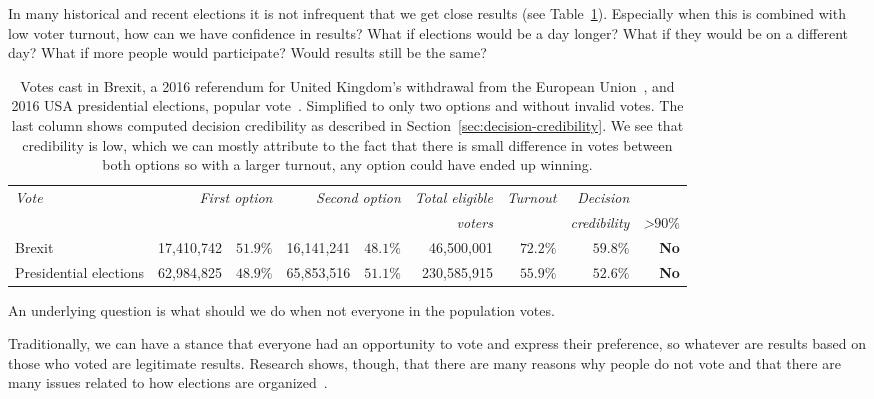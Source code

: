 \documentclass[format=acmsmall, review=true, screen=true, anonymous=true]{acmart}
\begin{document}
In many historical and recent elections it is not infrequent that we get close results (see Table~\ref{tab:example}).
Especially when this is combined with low voter turnout, how can we have confidence in results?
What if elections would be a day longer? What if they would be on a different day? What if
more people would participate? Would results still be the same?

\begin{table}
  \centering
  \begin{small}
  \begin{tabular}{l r r r r r r r r}
    {\small\textit{Vote}} & \multicolumn{2}{r}{\small \textit{First option}} & \multicolumn{2}{r}{\small \textit{Second option}} & {\small \textit{Total eligible}} & {\small \textit{Turnout}} & {\small \textit{Decision}} \\
    & & & & & {\small \textit{voters}} & & {\small \textit{credibility}} & {\small \textit{>$90\%$}}\\
    \midrule
    Brexit & 17,410,742 & $51.9\%$ & 16,141,241 & $48.1\%$ & 46,500,001 & $72.2\%$ & $59.8\%$ & \textbf{No}\\
    Presidential elections & 62,984,825 & $48.9\%$ & 65,853,516 & $51.1\%$ & 230,585,915 & $55.9\%$ & $52.6\%$ & \textbf{No}\\
  \end{tabular}
  \end{small}
  \bigskip\caption{Votes cast in Brexit, a 2016 referendum for United Kingdom's withdrawal from the European Union~\protect\cite{brexitresults},
  and 2016 USA presidential elections, popular vote~\protect\cite{usaresults1,usaresults2}. Simplified to only two options and without
  invalid votes. The last column shows computed decision credibility as described in Section~\ref{sec:decision-credibility}. We see that
  credibility is low, which we can mostly attribute to the fact that there is small difference in votes between both options so with a larger turnout, any option could have ended up winning.}\label{tab:example}
  \vspace{-0.3cm}
\end{table}

An underlying question is what should we do when not everyone in the population votes.

Traditionally, we can have a stance that everyone had an opportunity to vote and express
their preference, so whatever are results based on those who voted are legitimate results.
Research shows, though, that there are many reasons why people do not vote and that there
are many issues related to how elections are organized~\cite{CANCELA2016264, GIMPEL2003471}.
\end{document}
